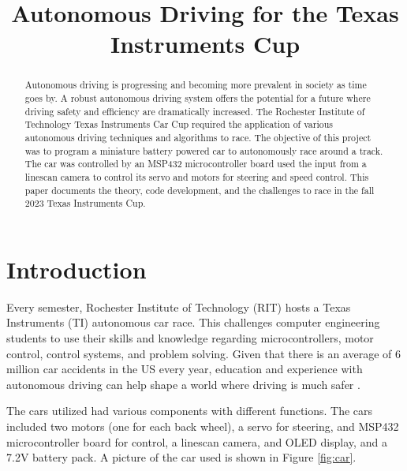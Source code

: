 \documentclass[conference]{IEEEtran}
\begin{document}
\title{Autonomous Driving for the Texas Instruments Cup}

\author{
\and
{}
}

\maketitle

\begin{abstract}
Autonomous driving is progressing and becoming more prevalent in society as time goes by. A robust autonomous driving system offers the potential for a future where driving safety and efficiency are dramatically increased. The Rochester Institute of Technology Texas Instruments Car Cup required the application of various autonomous driving techniques and algorithms to race. The objective of this project was to program a miniature battery powered car to autonomously race around a track. The car was controlled by an MSP432 microcontroller board used the input from a linescan camera to control its servo and motors for steering and speed control. This paper documents the theory, code development, and the challenges to race in the fall 2023 Texas Instruments Cup.
\end{abstract}

\section{Introduction}
Every semester, Rochester Institute of Technology (RIT) hosts a Texas Instruments (TI) autonomous car race. This challenges computer engineering students to use their skills and knowledge regarding microcontrollers, motor control, control systems, and problem solving. Given that there is an average of 6 million car accidents in the US every year, education and experience with autonomous driving can help shape a world where driving is much safer \cite{b1}.

The cars utilized had various components with different functions. The cars included two motors (one for each back wheel), a servo for steering, and MSP432 microcontroller board for control, a linescan camera, and OLED display, and a 7.2V battery pack. A picture of the car used is shown in Figure \ref{fig:car}.
\end{document}
